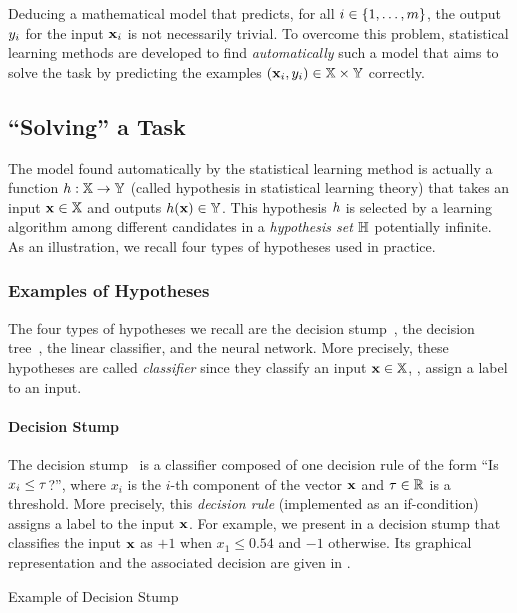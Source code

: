 Deducing a mathematical model that predicts, for all $i\in\{1,\dots,m\}$, the output $y_i$ for the input $\mathbf{x}_i$ is not necessarily trivial.
To overcome this problem, statistical learning methods are developed to find {\it automatically} such a model that aims to solve the task by predicting the examples $(\mathbf{x}_i, y_i)\in\mathbb{X}\times\mathbb{Y}$ correctly.

\subsection{``Solving'' a Task}

The model found automatically by the statistical learning method is actually a function $h:\mathbb{X}\to\mathbb{Y}$ (called hypothesis in statistical learning theory) that takes an input $\mathbf{x}\in\mathbb{X}$ and outputs $h(\mathbf{x})\in\mathbb{Y}$.
This hypothesis $h$ is selected by a learning algorithm among different candidates in a {\it  hypothesis set} $\mathbb{H}$ potentially infinite.
As an illustration, we recall four types of hypotheses used in practice.

\subsubsection{Examples of Hypotheses}

The four types of hypotheses we recall are the decision stump~\citep{IbaLangley1992}, the decision tree~\citep{BreimanFriedmanOlshenStone1984}, the linear classifier, and the neural network.
More precisely, these hypotheses are called {\it classifier} since they classify an input $\mathbf{x}\in\mathbb{X}$, \ie, assign a label to an input. 

\paragraph{Decision Stump}

The decision stump~\citep{IbaLangley1992} is a classifier composed of one decision rule of the form ``Is $x_i \le \tau$?'', where $x_i$ is the $i$-th component of the vector $\mathbf{x}$ and $\tau\in\mathbb{R}$ is a threshold.
More precisely, this {\it decision rule} (implemented as an if-condition) assigns a label to the input $\mathbf{x}$.
For example, we present in  a decision stump that classifies the input $\mathbf{x}$ as $+1$ when $x_1 \le 0.54$ and $-1$ otherwise.
Its graphical representation and the associated decision are given in .

\begin{algorithm}[H]
 \caption{Example of Decision Stump}
  \begin{algorithmic}
    \Else
    \EndIf
  \end{algorithmic}
  \label{chap:intro:algo:stump}
\end{algorithm}

